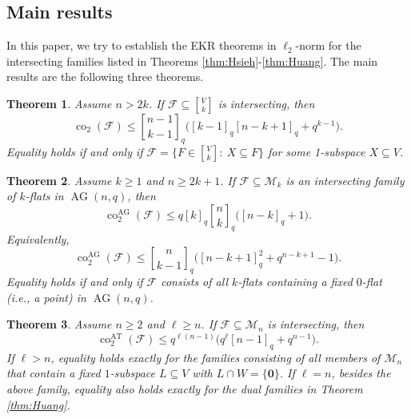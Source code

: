 \documentclass[11pt]{article}
\newtheorem{theorem}{Theorem}
\theoremstyle{definition}
\newcommand{\Gr}[2]{\genfrac{[}{]}{0pt}{}{#1}{#2}}
\newcommand{\qbinom}[2]{\genfrac{[}{]}{0pt}{}{#1}{#2}_q}
\newcommand{\co}{\operatorname{co}_2}
\newcommand{\AG}{\operatorname{AG}}
\begin{document}
\subsection{Main results}
In this paper, we try to establish the EKR theorems in $\ell_2$-norm for the intersecting families listed in Theorems \ref{thm:Hsieh}-\ref{thm:Huang}. The main results are the following three theorems.


\begin{theorem}\label{thm:vector-l2-ekr}
Assume $n>2k$.  If $\mathcal F\subseteq\Gr{V}{k}$ is intersecting, then
\begin{equation}\label{eq:vector-l2-main}
\co(\mathcal F)
\le
\qbinom{n-1}{k-1}
\bigl([k-1]_q[n-k+1]_q+q^{k-1}\bigr).
\end{equation}
Equality holds if and only if $\mathcal F=\{F\in \Gr{V}{k}:\ X\subseteq F\}$ for some 1-subspace $X\subseteq V$.
\end{theorem}

\begin{theorem}\label{thm:affine-l2-ekr}
Assume $k\ge 1$ and $n\ge2k+1$.  If $\mathcal F\subseteq\mathcal M_k$ is an intersecting family of $k$-flats in $\AG(n,q)$, then
\begin{equation}\label{eq:affine-main-first}
\operatorname{co}^{\mathrm{AG}}_2(\mathcal F)
\le q[k]_q\qbinom{n}{k}\bigl([n-k]_q+1\bigr).
\end{equation}
Equivalently,
\begin{equation}\label{eq:affine-main-second}
\operatorname{co}^{\mathrm{AG}}_2(\mathcal F)
\le \qbinom{n}{k-1}\bigl([n-k+1]_q^2+q^{n-k+1}-1\bigr).
\end{equation}
Equality holds if and only if $\mathcal F$ consists of all $k$-flats containing a fixed $0$-flat (i.e., a point) in $\AG(n,q)$.
\end{theorem}

\begin{theorem}\label{thm:attenuated-l2-ekr}
Assume $n\ge2$ and $\ell\ge n$.  If $\mathcal F\subseteq\mathcal M_n$ is intersecting, then
\begin{equation}\label{eq:attenuated-main}
\operatorname{co}^{\mathrm{AT}}_2(\mathcal F)
\le q^{\ell(n-1)}\bigl(q^\ell[n-1]_q+q^{n-1}\bigr).
\end{equation}
If $\ell>n$, equality holds exactly for the families consisting of all members of $\mathcal M_n$ that contain a fixed $1$-subspace $L\subseteq V$ with $L\cap W=\{\bm{0}\}$.  If $\ell=n$, besides the above family, equality also holds exactly for the dual families in Theorem \ref{thm:Huang}.
\end{theorem}
\end{document}
